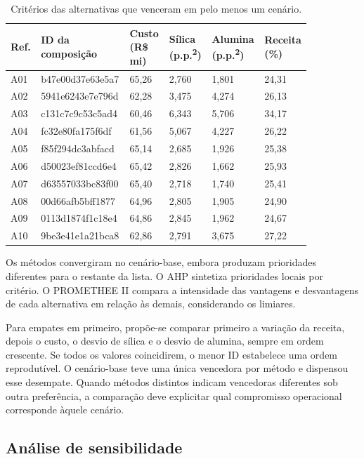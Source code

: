 \documentclass[12pt,a4paper]{article}
\begin{document}
\begin{table}[H]
\centering
\small
\caption{Critérios das alternativas que venceram em pelo menos um cenário.}
\begin{tabular}{@{}p{0.076\linewidth}p{0.230\linewidth}p{0.136\linewidth}p{0.136\linewidth}p{0.136\linewidth}p{0.136\linewidth}@{}}
\toprule
Ref. & ID da composição & Custo (R\$ mi) & Sílica (p.p.\textsuperscript{2}) & Alumina (p.p.\textsuperscript{2}) & Receita (\%) \\
\midrule
A01 & b47e00d37e63e5a7 & 65,26 & 2,760 & 1,801 & 24,31 \\
A02 & 5941e6243e7e796d & 62,28 & 3,475 & 4,274 & 26,13 \\
A03 & c131c7c9c53c5ad4 & 60,46 & 6,343 & 5,706 & 34,17 \\
A04 & fc32e80fa175f6df & 61,56 & 5,067 & 4,227 & 26,22 \\
A05 & f85f294dc3abfacd & 65,14 & 2,685 & 1,926 & 25,38 \\
A06 & d50023ef81ccd6e4 & 65,42 & 2,826 & 1,662 & 25,93 \\
A07 & d63557033bc83f00 & 65,40 & 2,718 & 1,740 & 25,41 \\
A08 & 00d66afb5bff1877 & 64,96 & 2,805 & 1,905 & 24,90 \\
A09 & 0113d1874f1c18e4 & 64,86 & 2,845 & 1,962 & 24,67 \\
A10 & 9be3e41e1a21bca8 & 62,86 & 2,791 & 3,675 & 27,22 \\
\bottomrule
\end{tabular}
\end{table}

Os métodos convergiram no cenário-base, embora produzam prioridades diferentes para o restante da lista. O AHP sintetiza prioridades locais por critério. O PROMETHEE II compara a intensidade das vantagens e desvantagens de cada alternativa em relação às demais, considerando os limiares.

Para empates em primeiro, propõe-se comparar primeiro a variação da receita, depois o custo, o desvio de sílica e o desvio de alumina, sempre em ordem crescente. Se todos os valores coincidirem, o menor ID estabelece uma ordem reprodutível. O cenário-base teve uma única vencedora por método e dispensou esse desempate. Quando métodos distintos indicam vencedoras diferentes sob outra preferência, a comparação deve explicitar qual compromisso operacional corresponde àquele cenário.

\clearpage

\subsection{Análise de sensibilidade}
\end{document}
